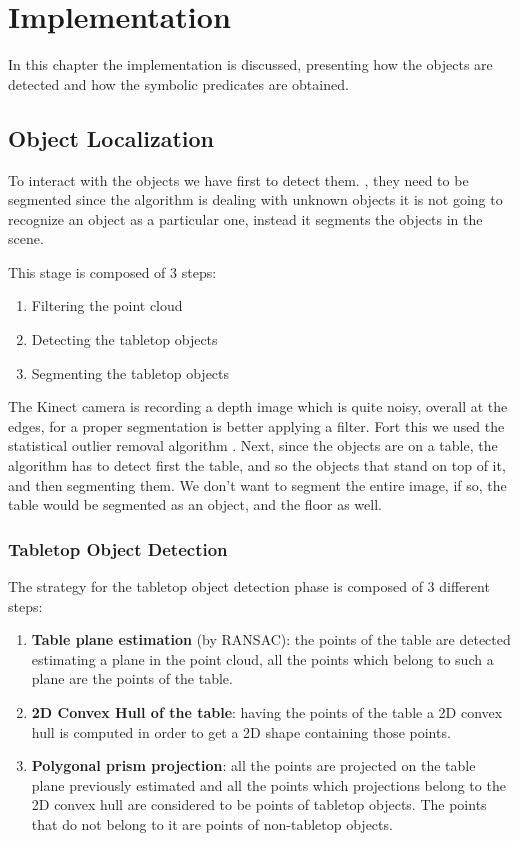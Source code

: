 \chapter{Implementation}
\label{ch:implementation}

In this chapter the implementation is discussed, presenting how the objects are detected and how the symbolic predicates are obtained. 

\section{Object Localization} 

To interact with the objects we have first to detect them. , they need to be segmented since the algorithm is dealing with unknown objects it is not going to recognize an object as a particular one, instead it segments the objects in the scene. 

This stage is composed of 3 steps:
\begin{enumerate}
\item Filtering the point cloud
\item Detecting the tabletop objects
\item Segmenting the tabletop objects
\end{enumerate}
The Kinect camera is recording a depth image which is quite noisy, overall at the edges, for a proper segmentation is better applying a filter. Fort this we used the statistical outlier removal algorithm \citep{rusu2008towards}.	
Next, since the objects are on a table, the algorithm has to detect first the table, and so the objects that stand on top of it, and then segmenting them. We don't want to segment the entire image, if so, the table would be segmented as an object, and the floor as well.

\subsection{Tabletop Object Detection} 
The strategy for the tabletop object detection phase is composed of 3 different steps:
\begin{enumerate}
\item \textbf{Table plane estimation} (by RANSAC): the points of the table are detected estimating a plane in the point cloud, all the points which belong to such a plane are the points of the table. 
\item \textbf{2D Convex Hull of the table}: having the points of the table a 2D convex hull is computed in order to get a 2D shape containing those points.
\item \textbf{Polygonal prism projection}: all the points are projected on the table plane previously estimated and all the points which projections belong to the 2D convex hull are considered to be points of tabletop objects. The points that do not belong to it are points of non-tabletop objects.
\end{enumerate}

